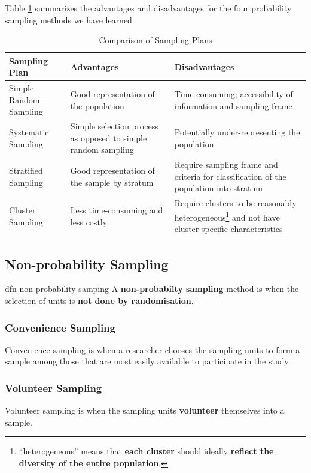 \documentclass[math,code]{amznotes}
\theoremstyle{remark}
\begin{document}
Table \ref{tab:chapter1-comparison-of-sampling-plans} summarizes the advantages and disadvantages for the four probability sampling methods we have learned
\begin{table}[h]
\centering
\begin{tabular}{|>{\raggedright\arraybackslash}p{4cm}|>{\raggedright\arraybackslash}p{5cm}|>{\raggedright\arraybackslash}p{6cm}|}
\hline
\textbf{Sampling Plan} & \textbf{Advantages} & \textbf{Disadvantages} \\
\hline
Simple Random Sampling & Good representation of the population & Time-consuming; accessibility of information and sampling frame \\
\hline
Systematic Sampling & Simple selection process as opposed to simple random sampling & Potentially under-representing the population \\
\hline
Stratified Sampling & Good representation of the sample by stratum & Require sampling frame and criteria for classification of the population into stratum \\
\hline
Cluster Sampling & Less time-consuming and less costly & Require clusters to be reasonably heterogeneous\footnote{``heterogeneous'' means that \textbf{each cluster} should ideally \textbf{reflect the diversity of the entire population}.} and not have cluster-specific characteristics \\
\hline
\end{tabular}
\caption{Comparison of Sampling Plans}
    \label{tab:chapter1-comparison-of-sampling-plans}
\end{table}

\subsection{Non-probability Sampling}
\begin{dfnbox}{dfn-non-probability-samping}
    A \textbf{non-probabilty sampling} method is when the selection of units is \textbf{not done by randomisation}.
\end{dfnbox}
\subsubsection{Convenience Sampling}
Convenience sampling is when a researcher chooses the sampling units to form a sample among those that are most easily available to participate in the study.
\subsubsection{Volunteer Sampling}
Volunteer sampling is when the sampling units \textbf{volunteer} themselves into a sample.
\end{document}
